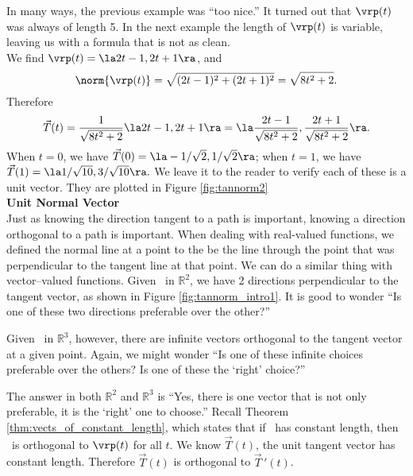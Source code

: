 In many ways, the previous example was ``too nice.'' It turned out that $\vrp(t)$ was always of length 5. In the next example the length of $\vrp(t)$ is variable, leaving us with a formula that is not as clean.\\

{We find $\vrp(t) = \la 2t-1,2t+1\ra$, and $$\norm{\vrp(t)} = \sqrt{(2t-1)^2+(2t+1)^2} = \sqrt{8t^2+2}.$$
Therefore $$\vec T(t) = \frac{1}{\sqrt{8t^2+2}}\la 2t-1,2t+1\ra = \la \frac{2t-1}{\sqrt{8t^2+2}},\frac{2t+1}{\sqrt{8t^2+2}}\ra.$$
When $t=0$, we have $\vec T(0) = \la -1/\sqrt{2},1/\sqrt{2}\ra$; when $t=1$, we have $\vec T(1) = \la 1/\sqrt{10}, 3/\sqrt{10}\ra.$ We leave it to the reader to verify each of these is a unit vector. They are plotted in Figure \ref{fig:tannorm2}
}\\

\noindent\textbf{\large Unit Normal Vector}\\

Just as knowing the direction tangent to a path is important, knowing a direction orthogonal to a path is important. When dealing with real-valued functions, we defined the normal line at a point to the be the line through the point that was perpendicular to the tangent line at that point. We can do a similar thing with vector--valued functions. Given \vrt\ in $\mathbb{R}^2$, we have 2 directions perpendicular to the tangent vector, as shown in Figure \ref{fig:tannorm_intro1}. It is good to wonder ``Is one of these two directions preferable over the other?''

Given \vrt\ in $\mathbb{R}^3$, however, there are infinite vectors orthogonal to the tangent vector at a given point. Again, we might wonder ``Is one of these infinite choices preferable over the others? Is one of these the `right' choice?''

The answer in both $\mathbb{R}^2$ and $\mathbb{R}^3$ is ``Yes, there is one vector that is not only preferable, it is the `right' one to choose.'' Recall Theorem \ref{thm:vects_of_constant_length}, which states that if \vrt\ has constant length, then \vrt\ is orthogonal to $\vrp(t)$ for all $t$. We know $\vec T(t)$, the unit tangent vector has constant length. Therefore $\vec T(t)$ is orthogonal to $\vec T\,'(t)$.

